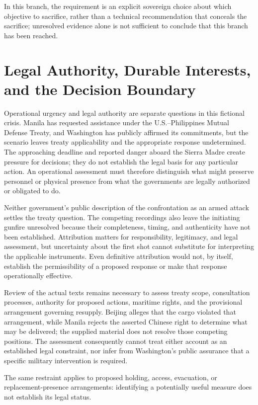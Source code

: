 \documentclass[11pt]{article}
\begin{document}
In this branch, the requirement is an explicit sovereign choice about which objective to sacrifice, rather than a technical recommendation that conceals the sacrifice; unresolved evidence alone is not sufficient to conclude that this branch has been reached.

\section{Legal Authority, Durable Interests, and the Decision Boundary}
Operational urgency and legal authority are separate questions in this fictional crisis. Manila has requested assistance under the U.S.–Philippines Mutual Defense Treaty, and Washington has publicly affirmed its commitments, but the scenario leaves treaty applicability and the appropriate response undetermined. The approaching deadline and reported danger aboard the Sierra Madre create pressure for decisions; they do not establish the legal basis for any particular action. An operational assessment must therefore distinguish what might preserve personnel or physical presence from what the governments are legally authorized or obligated to do.

Neither government’s public description of the confrontation as an armed attack settles the treaty question. The competing recordings also leave the initiating gunfire unresolved because their completeness, timing, and authenticity have not been established. Attribution matters for responsibility, legitimacy, and legal assessment, but uncertainty about the first shot cannot substitute for interpreting the applicable instruments. Even definitive attribution would not, by itself, establish the permissibility of a proposed response or make that response operationally effective.

Review of the actual texts remains necessary to assess treaty scope, consultation processes, authority for proposed actions, maritime rights, and the provisional arrangement governing resupply. Beijing alleges that the cargo violated that arrangement, while Manila rejects the asserted Chinese right to determine what may be delivered; the supplied material does not resolve those competing positions. The assessment consequently cannot treat either account as an established legal constraint, nor infer from Washington’s public assurance that a specific military intervention is required.

The same restraint applies to proposed holding, access, evacuation, or replacement-presence arrangements: identifying a potentially useful measure does not establish its legal status.
\end{document}
